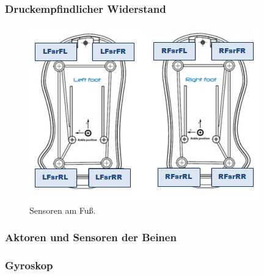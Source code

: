 \subsubsection{Druckempfindlicher Widerstand}
\begin{figure}[b]
	\centering
	\includegraphics[width=0.6\linewidth]{Bilder/hardware_semelles.png}
	\caption{Sensoren am Fuß. %
	}
	\label{hardware_semelles}
\end{figure}

\subsubsection{Aktoren und Sensoren der Beinen}

\subsubsection{Gyroskop}

